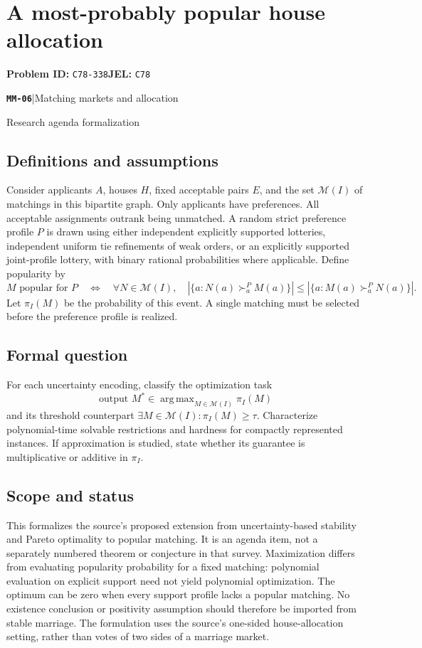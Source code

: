 \documentclass[11pt,a4paper]{article}
\DeclareMathOperator*{\argmax}{arg\,max}
\newcommand{\entrymeta}[3]{{\sffamily\small\color{muted}\textbf{\texttt{#1}}\quad|\quad #2\par #3\par}}
\begin{document}
\section*{A most-probably popular house allocation}
\textbf{Problem ID:} \texttt{C78-338}\quad \textbf{JEL:} \texttt{C78}\par
\label{problem:OP-0547}
\label{beyond:MM-06}
\entrymeta{MM-06}{Matching markets and allocation}{Research agenda formalization}
\subsection*{Definitions and assumptions}
Consider applicants $A$, houses $H$, fixed acceptable pairs $E$, and the set $\mathcal M(I)$ of matchings in this bipartite graph. Only applicants have preferences. All acceptable assignments outrank being unmatched. A random strict preference profile $P$ is drawn using either independent explicitly supported lotteries, independent uniform tie refinements of weak orders, or an explicitly supported joint-profile lottery, with binary rational probabilities where applicable. Define popularity by
\[
 M\text{ popular for }P
 \quad\Longleftrightarrow\quad
 \forall N\in\mathcal M(I),\quad
 |\{a:N(a)\succ_a^P M(a)\}|
 \le |\{a:M(a)\succ_a^P N(a)\}|.
\]
Let $\pi_I(M)$ be the probability of this event. A single matching must be selected before the preference profile is realized.
\subsection*{Formal question}
For each uncertainty encoding, classify the optimization task
\[
 \text{output }M^*\in\argmax_{M\in\mathcal M(I)}\pi_I(M)
\]
and its threshold counterpart $\exists M\in\mathcal M(I):\pi_I(M)\ge\tau$. Characterize polynomial-time solvable restrictions and hardness for compactly represented instances. If approximation is studied, state whether its guarantee is multiplicative or additive in $\pi_I$.
\subsection*{Scope and status}
This formalizes the source's proposed extension from uncertainty-based stability and Pareto optimality to popular matching. It is an agenda item, not a separately numbered theorem or conjecture in that survey. Maximization differs from evaluating popularity probability for a fixed matching: polynomial evaluation on explicit support need not yield polynomial optimization. The optimum can be zero when every support profile lacks a popular matching. No existence conclusion or positivity assumption should therefore be imported from stable marriage. The formulation uses the source's one-sided house-allocation setting, rather than votes of two sides of a marriage market.
\end{document}
